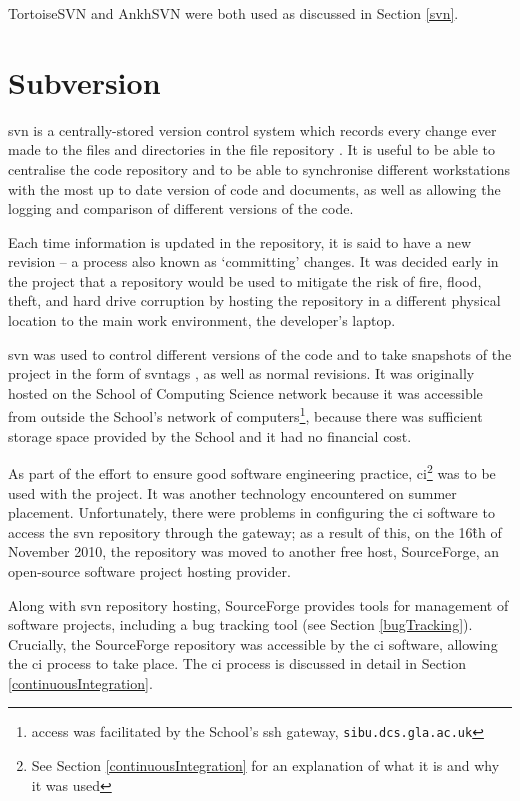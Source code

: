 TortoiseSVN and AnkhSVN were both used as discussed in Section \ref{svn}.

\section{Subversion}
\label{svn}
\gls{svn} is a centrally-stored version control system which records every change ever made to the files and directories in the file repository \cite{CFP04c1}.  It is useful to be able to centralise the code repository and to be able to synchronise different workstations with the most up to date version of code and documents, as well as allowing the logging and comparison of different versions of the code.  

Each time information is updated in the repository, it is said to have a new revision -- a process also known as `committing' changes.  It was decided early in the project that a repository would be used to mitigate the risk of fire, flood, theft, and hard drive corruption by hosting the repository in a different physical location to the main work environment, the developer's laptop.  

\gls{svn} was used to control different versions of the code and to take snapshots of the project in the form of \gls{svntag}s \cite{CFP04c4}, as well as normal revisions.  It was originally hosted on the School of Computing Science network because it was accessible from outside the School's network of computers\footnote{access was facilitated by the School's \gls{ssh} gateway, \texttt{sibu.dcs.gla.ac.uk}}, because there was sufficient storage space provided by the School and it had no financial cost.  

As part of the effort to ensure good software engineering practice, \gls{ci}\footnote{See Section \ref{continuousIntegration} for an explanation of what it is and why it was used} was to be used with the project.  It was another technology encountered on summer placement.  Unfortunately, there were problems in configuring the \gls{ci}  software to access the \gls{svn} repository through the gateway; as a result of this, on the 16\^{th} of November 2010, the repository was moved to another free host, SourceForge, an open-source software project hosting provider.  

Along with \gls{svn} repository hosting, SourceForge provides tools for management of software projects, including a bug tracking tool (see Section \ref{bugTracking}).  Crucially, the SourceForge repository was accessible by the \gls{ci} software, allowing the \gls{ci} process to take place.  The \gls{ci} process is discussed in detail in Section \ref{continuousIntegration}.

